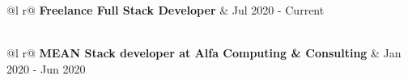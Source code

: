 \documentclass[a4paper,12pt]{article}
\begin{document}
\begin{tabularx}{\linewidth}{ @{}l r@{} }
\textbf{Freelance Full Stack Developer} & \hfill Jul 2020 - Current \\[3.75pt]
  \\
\end{tabularx}

\begin{tabularx}{\linewidth}{ @{}l r@{} }
\textbf{MEAN Stack developer at Alfa Computing \& Consulting} & \hfill Jan 2020 - Jun 2020 \\[3.75pt]
  \\
\end{tabularx}



\end{document}
